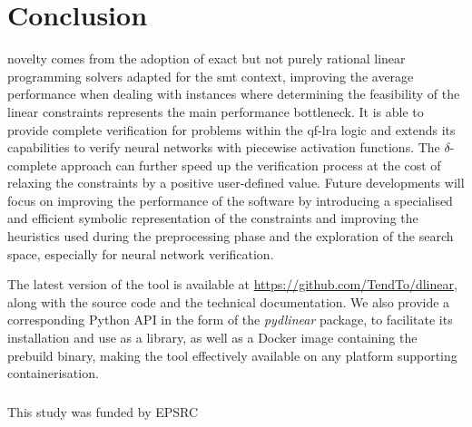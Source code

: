 \documentclass[runningheads]{llncs}
\begin{document}
\section{Conclusion}

\dlinear novelty comes from the adoption of exact but not purely rational linear programming solvers adapted for the \gls{smt} context, improving the average performance when dealing with instances where determining the feasibility of the linear constraints represents the main performance bottleneck.
It is able to provide complete verification for problems within the \gls{qf-lra} logic and extends its capabilities to verify neural networks with piecewise activation functions.
The $\delta$-complete approach can further speed up the verification process at the cost of relaxing the constraints by a positive user-defined value.
Future developments will focus on improving the performance of the software by introducing a specialised and efficient symbolic representation of the constraints and improving the heuristics used during the preprocessing phase and the exploration of the search space, especially for neural network verification.

The latest version of the tool is available at \url{https://github.com/TendTo/dlinear}, along with the source code and the technical documentation.
We also provide a corresponding Python API in the form of the \textit{pydlinear} package, to facilitate its installation and use as a library, as well as a Docker image containing the prebuild binary, making the tool effectively available on any platform supporting containerisation.

\begin{credits}
    \subsubsection{\ackname} This study was funded by EPSRC
\end{credits}




\end{document}
